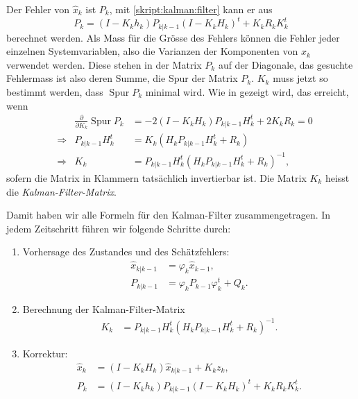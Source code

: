 Der Fehler von $\hat{x}_k$ ist $P_k$, mit \eqref{skript:kalman:filter}
kann er aus
\begin{equation}
P_k
=
(I-K_kh_k)P_{k|k-1}(I-K_kH_k)^t + K_kR_kK_k^t
\label{skript:fehler:korrektur}
\end{equation}
berechnet werden.
Als Mass für die Grösse des Fehlers können die Fehler jeder einzelnen 
Systemvariablen, also die Varianzen der Komponenten von $x_k$ 
verwendet werden.
Diese stehen in der Matrix $P_k$ auf der Diagonale, 
das gesuchte Fehlermass ist also deren Summe, die Spur der Matrix $P_k$.
$K_k$ muss jetzt so bestimmt werden, dass $\operatorname{Spur} P_k$ 
minimal wird.
Wie in \cite{skript:wrstatskript} gezeigt wird, das erreicht, wenn
\[
\begin{aligned}
&&
\frac{\partial}{\partial K_k} \operatorname{Spur}P_k
&=
-2(I-K_kH_k)P_{k|k-1}H_k^t + 2K_kR_k
=
0
\\
&\Rightarrow&
P_{k|k-1}H_k^t
&=
K_k(H_kP_{k|k-1}H_k^t+R_k)
\\
&\Rightarrow&
K_k
&=
P_{k|k-1}H_k^t
(H_kP_{k|k-1}H_k^t+R_k)^{-1},
\end{aligned}
\]
sofern die Matrix in Klammern tatsächlich invertierbar ist.
Die Matrix $K_k$ heisst die {\em Kalman-Filter-Matrix}.
%

Damit haben wir alle Formeln für den Kalman-Filter zusammengetragen.
In jedem Zeitschritt führen wir folgende Schritte durch:
\begin{enumerate}
\item
Vorhersage des Zustandes und des Schätzfehlers:
\begin{align*}
\hat{x}_{k|k-1}&= \varphi_k\hat{x}_{k-1},\\
P_{k|k-1}      &= \varphi_kP_{k-1}\varphi_k^t + Q_k.
\end{align*}
\item
Berechnung der Kalman-Filter-Matrix
\begin{align}
K_k
&=
P_{k|k-1}H_k^t
(H_kP_{k|k-1}H_k^t+R_k)^{-1}.
\label{kalman:kmatrix}
\end{align}
\item
Korrektur:
\begin{align*}
\hat{x}_k&= (I-K_kH_k)\hat{x}_{k|k-1} + K_kz_k,\\
P_k      &= 
(I-K_kh_k)P_{k|k-1}(I-K_kH_k)^t + K_kR_kK_k^t.
\end{align*}
\end{enumerate}

